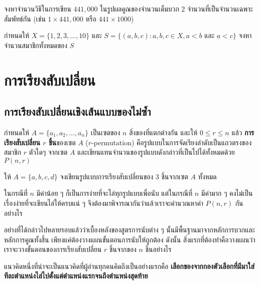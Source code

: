 \begin{exam}
	จงหาจำนวนวิธีในการเขียน $ 441,000 $ ในรูปผลคูณของจำนวนเต็มบวก 2 จำนวนที่เป็นจำนวนเฉพาะสัมพัทธ์กัน (เช่น $1\times 441,000$ หรือ $ 441 \times 1000 $)
\end{exam}

\begin{exam}
	กำหนดให้ $ X = \{1,2,3,\dots,10\} $ และ $ S=\{(a,b,c)\colon a,b,c\in X, a<b \text{ และ } a<c\} $ จงหาจำนวนสมาชิกทั้งหมดของ $ S $
\end{exam}

\section{การเรียงสับเปลี่ยน}
\subsection{การเรียงสับเปลี่ยนเชิงเส้นแบบของไม่ซ้ำ}
กำหนดให้ $ A=\{a_1,a_2,\dots , a_n\} $ เป็นเซตของ $ n $ สิ่งของที่แตกต่างกัน และให้ $ 0\leq r\leq n $ แล้ว \textbf{การเรียงสับเปลี่ยน $ r $ ชิ้น}ของเซต $ A $ ($ r $-permutation)  คือรูปแบบในการจัดเรียงลำดับเป็นแถวตรงของสมาชิก $ r $ ตัวใดๆ จากเซต $ A $ และเขียนแทนจำนวนของรูปแบบดังกล่าวที่เป็นไปได้ทั้งหมดด้วย $ P(n,r) $

\begin{exam}\label{enumPerm}
	ให้ $ A=\{a,b,c,d\} $ จงเขียนรูปแบบการเรียงสับเปลี่ยนของ 3 ชิ้นจากเซต $ A $ ทั้งหมด
\end{exam}
ในกรณีที่ $ n $ มีค่าน้อย ๆ ก็เป็นการง่ายที่จะไล่ทุกรูปแบบเพื่อนับ แต่ในกรณีที่ $ n $ มีค่ามาก ๆ คงไม่เป็นเรื่องง่ายที่จะเขียนไล่ให้ครบแน่ ๆ จึงต้องมาพิจารณากันว่าแล้วเราจะคำนวณหาค่า $ P(n,r) $ กันอย่างไร

อย่างที่ได้กล่าวไปหลายรอบแล้วว่าเบื้องหลังของสูตรการนับต่าง ๆ นั้นมีพื้นฐานมาจากหลักการบวกและหลักการคูณทั้งสิ้น เพียงแค่ต้องวางแผนขั้นตอนการนับให้ถูกต้อง ดังนั้น สิ่งแรกที่ต้องทำคือวางแผนว่าเราจะวางขั้นตอนของการเรียงสับเปลี่ยน $ r $ ชิ้นจากของ $ n $ ชิ้นอย่างไร

แนวคิดหนึ่งที่น่าจะเป็นแนวคิดที่ผู้อ่านทุกคนคิดถึงเป็นอย่างแรกคือ \textbf{เลือกของจากกองตัวเลือกที่มีมาใส่ทีละตำแหน่งไล่ไปตั้งแต่ตำแหน่งแรกจนถึงตำแหน่งสุดท้าย} \\


